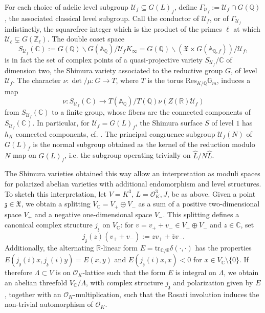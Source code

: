 \documentclass[12pt,a4paper,reqno]{amsart}
\theoremstyle{definition}
\numberwithin{definition}{subsection}
\theoremstyle{definition}
\numberwithin{Definition}{subsection}
\theoremstyle{remark}
\theoremstyle{remark}
\numberwithin{Remark}{subsection}
\theoremstyle{remark}
\theoremstyle{plain}
\numberwithin{Theorem}{subsection}
\theoremstyle{plain}
\theoremstyle{plain}
\theoremstyle{plain}
\theoremstyle{plain}
\theoremstyle{plain}
\theoremstyle{plain}
\theoremstyle{plain}
\newcommand*{\Z}{\mathbb{Z}}
\newcommand*{\Q}{\mathbb{Q}}
\newcommand*{\R}{\mathbb{R}}
\newcommand*{\Cc}{\mathbb{C}}
\newcommand*{\A}{\mathbb{A}}
\newcommand*{\Gg}{\mathbb{G}}
\begin{document}
\noindent For each choice of adelic level subgroup $\mathcal{U}_f\subseteq G(L)_f$, define $\Gamma_{\mathcal{U}_f}:=\mathcal{U}_f\cap G(\Q)$, the associated classical level subgroup. Call the conductor of $\mathcal{U}_f$, or of $\Gamma_{\mathcal{U}_f}$ indistinctly, the squarefree integer which is the product of the primes $\ell$ at which $\mathcal{U}_\ell\subsetneq G(\Z_\ell)$.
The double coset space
\[
S_{\mathcal{U}_f}(\Cc):= G(\Q)\backslash G(\A_\Q)/\mathcal{U}_fK_\infty=G(\Q)\backslash (\mathfrak{X}\times G(\A_{\Q,f}))/\mathcal{U}_f,
\]
is in fact the set of complex points of a quasi-projective variety $S_{\mathcal{U}_f}/\Cc$ of dimension two, the Shimura variety associated to the reductive group $G$, of level $\mathcal{U}_f$. The character $\nu:\det/\mu:G\to T$, where $T$ is the torus $\text{Res}_{K/\Q}\Gg_m$, induces a map
\[
\nu:S_{\mathcal{U}_f}(\Cc)\to T(\A_\Q)/T(\Q)\nu(Z(\R)\mathcal{U}_f)
\]
from $S_{\mathcal{U}_f}(\Cc)$ to a finite group, whose fibers are the connected components of $S_{\mathcal{U}_f}(\Cc)$. In particular, for $\mathcal{U}_f=G(L)_f$, the Shimura surface $S$ of level $1$ has $h_K$ connected components, cf. \cite[p. 13]{goren}. The principal congruence subgroup $\mathcal{U}_f(N)$ of $G(L)_f$ is the normal subgroup obtained as the kernel of the reduction modulo $N$ map on $G(L)_f$, i.e. the subgroup operating trivially on $\hat{L}/N\hat{L}$.

The Shimura varieties obtained this way allow an interpretation as moduli spaces for polarized abelian varieties with additional endomorphism and level structures. To sketch this interpretation, let $V=K^3$, $L=\mathcal{O}_K^3, J$, be as above. Given a point $\mathfrak{z}\in \mathfrak{X}$, we obtain a splitting $V_\Cc=V_+\oplus V_-$ as a sum of a positive two-dimensional space $V_+$ and a negative one-dimensional space $V_-$. This splitting defines a canonical complex structure $j_\mathfrak{z}$ on $V_\Cc$: for $v=v_++v_-\in V_+\oplus V_-$ and $z\in \Cc$, set
\[
j_\mathfrak{z}(z)(v_++v_-):=zv_++\overline{z}v_-.
\]
Additionally, the alternating $\R$-linear form $E=\text{tr}_{\Cc/\R}\delta(\cdot,\cdot)$ has the properties $E(j_\mathfrak{z}(i)x,j_\mathfrak{z}(i)y)=E(x,y)$ and $E(j_\mathfrak{z}(i)x,x)<0$ for $x\in V_\Cc\setminus \{0\}$. If therefore $\Lambda\subset V$ is on $\mathcal{O}_K$-lattice such that the form $E$ is integral on $\Lambda$, we obtain an abelian threefold $V_\Cc/\Lambda$, with complex structure $j_\mathfrak{z}$ and polarization given by $E$, together with an $\mathcal{O}_K$-multiplication, such that the Rosati involution induces the non-trivial automorphism of $\mathcal{O}_K$.
\end{document}
